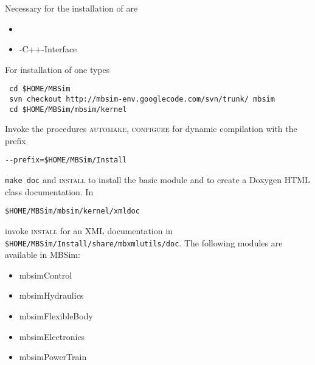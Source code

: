 \subsubsection{\MBSim}
Necessary for the installation of \MBSim{} are
\begin{itemize}
\item \FMatVec{}
\item \OpenMBV{}-C++-Interface
\end{itemize}
For installation of \MBSim{} one types
\begin{verbatim}
 cd $HOME/MBSim
 svn checkout http://mbsim-env.googlecode.com/svn/trunk/ mbsim
 cd $HOME/MBSim/mbsim/kernel
\end{verbatim}
Invoke the procedures \textsc{automake, configure} for dynamic compilation with the prefix
\begin{verbatim}
--prefix=$HOME/MBSim/Install
\end{verbatim}
\texttt{make doc} and \textsc{install} to install the basic module and to create a Doxygen HTML class documentation. In
\begin{verbatim}
$HOME/MBSim/mbsim/kernel/xmldoc
\end{verbatim}
invoke \textsc{install} for an XML documentation in \texttt{\$HOME/MBSim/Install/share/mbxmlutils/doc}.\vspace{5mm}
The following modules are available in MBSim:
\begin{itemize}
\item mbsimControl
\item mbsimHydraulics
\item mbsimFlexibleBody
\item mbsimElectronics
\item mbsimPowerTrain
\end{itemize}

